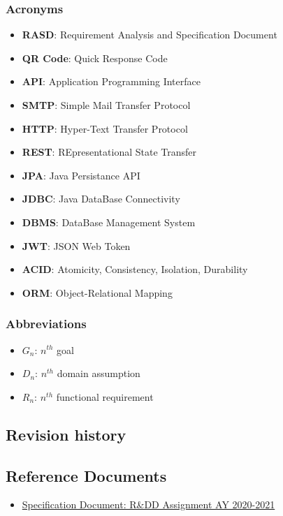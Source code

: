 \subsubsection{Acronyms}
\begin{itemize}
    \item \textbf{RASD}: Requirement Analysis and Specification Document
    \item \textbf{QR Code}: Quick Response Code
    \item \textbf{API}: Application Programming Interface
    \item \textbf{SMTP}: Simple Mail Transfer Protocol %
    \item \textbf{HTTP}: Hyper-Text Transfer Protocol
    \item \textbf{REST}: REpresentational State Transfer
    \item \textbf{JPA}: Java Persistance API
    \item \textbf{JDBC}: Java DataBase Connectivity
    \item \textbf{DBMS}: DataBase Management System
    \item \textbf{JWT}: JSON Web Token
    \item \textbf{ACID}: Atomicity, Consistency, Isolation, Durability
    \item \textbf{ORM}: Object-Relational Mapping
\end{itemize}
\subsubsection{Abbreviations}
\begin{itemize}
    \item \textbf{$G_n$}: $n^{th}$ goal
    \item \textbf{$D_n$}: $n^{th}$ domain assumption
    \item \textbf{$R_n$}: $n^{th}$ functional requirement
\end{itemize}
\subsection{Revision history}


\subsection{Reference Documents}
\begin{itemize}
    \item \href{https://beep.metid.polimi.it/documents/121843524/23d1869d-ab17-4e36-979e-f1ccbc59be24}{Specification Document: R\&DD Assignment AY 2020-2021}
\end{itemize}


